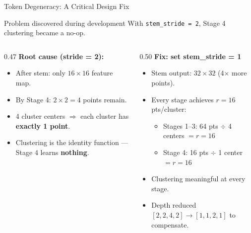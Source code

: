 \documentclass{beamer}
\begin{document}
\begin{frame}{Token Degeneracy: A Critical Design Fix}
  \begin{block}{Problem discovered during development}
    With \texttt{stem\_stride = 2}, Stage 4 clustering became a no-op.
  \end{block}

  \begin{columns}[T]
    \begin{column}{0.47\textwidth}
      \textbf{Root cause (stride = 2):}
      \begin{itemize}\small\setlength\itemsep{3pt}
        \item After stem: only $16\!\times\!16$ feature map.
        \item By Stage 4: $2\!\times\!2 = 4$ points remain.
        \item 4 cluster centers $\Rightarrow$ each cluster
              has \textbf{exactly 1 point}.
        \item Clustering is the identity function ---
              Stage 4 learns \textbf{nothing}.
      \end{itemize}
    \end{column}
    \begin{column}{0.50\textwidth}
      \textbf{Fix: set stem\_stride = 1}
      \begin{itemize}\small\setlength\itemsep{2pt}
        \item Stem output: $32\!\times\!32$ (4$\times$ more points).
        \item Every stage achieves $r = 16$ pts/cluster:
          \begin{itemize}\footnotesize\setlength\itemsep{2pt}
            \item Stages 1--3: 64 pts $\div$ 4 centers $= r\!=\!16$
            \item Stage 4: 16 pts $\div$ 1 center $= r\!=\!16$
          \end{itemize}
        \item Clustering meaningful at every stage. \checkmark
        \item Depth reduced $[2,2,4,2]\!\to\![1,1,2,1]$ to compensate.
      \end{itemize}
    \end{column}
  \end{columns}
\end{frame}
\end{document}
